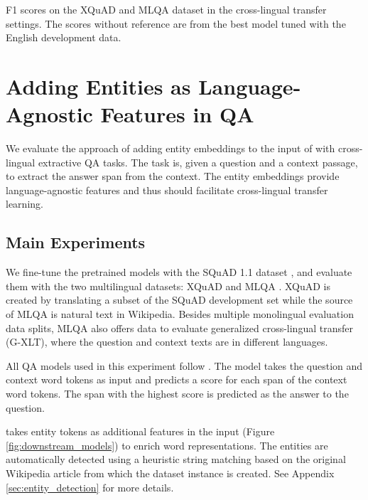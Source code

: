 \documentclass[11pt]{article}
\newcommand{\minisection}[1]{\noindent{\bf {#1}.}}
\newcommand{\Figure}[1]{Figure \ref{#1}}
\begin{document}
\begin{table*}[ht]
  \caption{F1 scores on the XQuAD and MLQA dataset in the cross-lingual transfer settings. The scores without reference are from the best model tuned with the English development data.}
  \label{table:results-qa}
  \vspace{-3mm}
\end{table*}
\normalsize
 
\vspace{-1mm}
\section{Adding Entities as Language-Agnostic Features in QA}
\label{sec:experiment-qa}
\vspace{-1mm}

We evaluate the approach of adding entity embeddings to the input of \mlukeE{} with cross-lingual extractive QA tasks.
The task is, given a question and a context passage, to extract the answer span from the context.
The entity embeddings provide language-agnostic features and thus should facilitate cross-lingual transfer learning.

\subsection{Main Experiments}

\minisection{Datasets}
We fine-tune the pretrained models with the SQuAD 1.1 dataset \citep{rajpurkar-etal-2016-squad}, and evaluate them with the two multilingual datasets: XQuAD \citep{artetxe-etal-2020-cross} and MLQA \citep{lewis-etal-2020-mlqa}.
XQuAD is created by translating a subset of the SQuAD development set while the source of MLQA is natural text in Wikipedia.
Besides multiple monolingual evaluation data splits, MLQA also offers data to evaluate generalized cross-lingual transfer (G-XLT), where the question and context texts are in different languages.

\minisection{Models}
All QA models used in this experiment follow \citet{devlin2018bert}.
The model takes the question and context word tokens as input and predicts a score for each span of the context word tokens. The span with the highest score is predicted as the answer to the question.

\mlukeE{} takes entity tokens as additional features in the input (\Figure{fig:downstream_models}) to enrich word representations.
The entities are automatically detected using a heuristic string matching based on the original Wikipedia article from which the dataset instance is created.
See Appendix \ref{sec:entity_detection} for more details.
\end{document}
